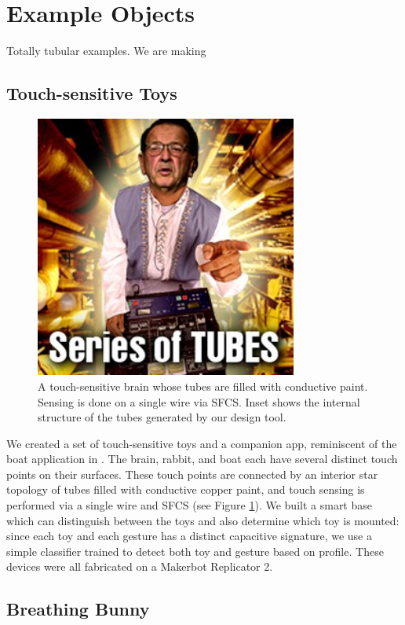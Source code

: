 \section{Example Objects}

Totally tubular examples.  We are making

\subsection{Touch-sensitive Toys}

\begin{figure}[h]
\centering
    \includegraphics[width=3.4in]{figures/series-of-tubes.jpg}
\caption{A touch-sensitive brain whose tubes are filled with conductive paint.  Sensing is done on a single wire via SFCS.  Inset shows the internal structure of the tubes generated by our design tool.}
\label{fig:toy}
\end{figure}

We created a set of touch-sensitive toys and a companion app, reminiscent of the boat application in \cite{Harrison-acoustic}.  The brain, rabbit, and boat each have several distinct touch points on their surfaces.  These touch points are connected by an interior star topology of tubes filled with conductive copper paint, and touch sensing is performed via a single wire and SFCS (see Figure \ref{fig:toy}).  We built a smart base which can distinguish between the toys and also determine which toy is mounted: since each toy and each gesture has a distinct capacitive signature, we use a simple classifier trained to detect both toy and gesture based on profile.  These devices were all fabricated on a Makerbot Replicator 2.

\subsection{Breathing Bunny}

